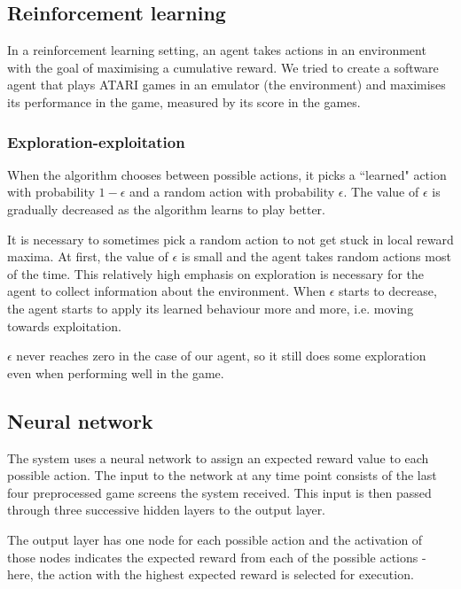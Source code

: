 \documentclass[a4paper,12pt]{article}
\begin{document}
\subsection{Reinforcement learning}
\label{sec:reinforcementlearning}
In a reinforcement learning setting, an agent takes actions in an environment with the goal of maximising a cumulative reward. We tried to create a software agent that plays ATARI games in an emulator (the environment) and maximises its performance in the game, measured by its score in the games.

\subsubsection{Exploration-exploitation}
When the algorithm chooses between possible actions, it picks a ``learned" action with probability $1-\epsilon$ and a random action with probability $\epsilon$. The value of $\epsilon$ is gradually decreased as the algorithm learns to play better.

It is necessary to sometimes pick a random action to not get stuck in local reward maxima. At first, the value of $\epsilon$ is small and the agent takes random actions most of the time. This relatively high emphasis on exploration is necessary for the agent to collect information about the environment. When $\epsilon$ starts to decrease, the agent starts to apply its learned behaviour more and more, i.e. moving towards exploitation.

$\epsilon$ never reaches zero in the case of our agent, so it still does some exploration even when performing well in the game.

\subsection{Neural network}
The system uses a neural network to assign an expected reward value to each possible action. The input to the network at any time point consists of the last four preprocessed game screens the system received. This input is then passed through three successive hidden layers to the output layer. 

The output layer has one node for each possible action and the activation of those nodes indicates the expected reward from each of the possible actions - here, the action with the highest expected reward is selected for execution.
\end{document}
